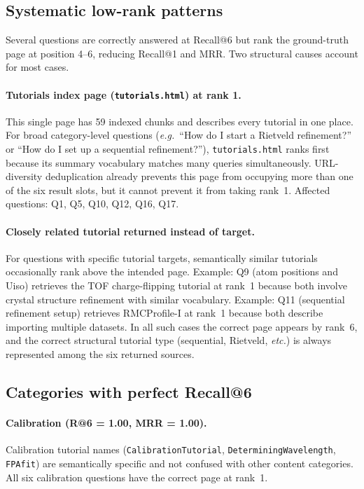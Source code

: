 \documentclass[12pt,a4paper]{article}
\begin{document}
\subsection{Systematic low-rank patterns}

Several questions are correctly answered at Recall@6 but rank the
ground-truth page at position 4--6, reducing Recall@1 and MRR.
Two structural causes account for most cases.

\paragraph{Tutorials index page (\texttt{tutorials.html}) at rank 1.}
This single page has 59 indexed chunks and describes every tutorial in
one place.
For broad category-level questions (\emph{e.g.}\ ``How do I start a
Rietveld refinement?'' or ``How do I set up a sequential refinement?''),
\texttt{tutorials.html} ranks first because its summary vocabulary matches
many queries simultaneously.
URL-diversity deduplication already prevents this page from occupying
more than one of the six result slots, but it cannot prevent it from
taking rank~1.
Affected questions: Q1, Q5, Q10, Q12, Q16, Q17.

\paragraph{Closely related tutorial returned instead of target.}
For questions with specific tutorial targets, semantically similar
tutorials occasionally rank above the intended page.
Example: Q9 (atom positions and Uiso) retrieves the TOF charge-flipping
tutorial at rank~1 because both involve crystal structure refinement
with similar vocabulary.
Example: Q11 (sequential refinement setup) retrieves RMCProfile-I at
rank~1 because both describe importing multiple datasets.
In all such cases the correct page appears by rank~6, and the correct
structural tutorial type (sequential, Rietveld, \emph{etc.}) is
always represented among the six returned sources.

\subsection{Categories with perfect Recall@6}

\paragraph{Calibration (R@6 = 1.00, MRR = 1.00).}
Calibration tutorial names (\texttt{CalibrationTutorial},
\texttt{DeterminingWavelength}, \texttt{FPAfit}) are semantically
specific and not confused with other content categories.
All six calibration questions have the correct page at rank~1.
\end{document}
